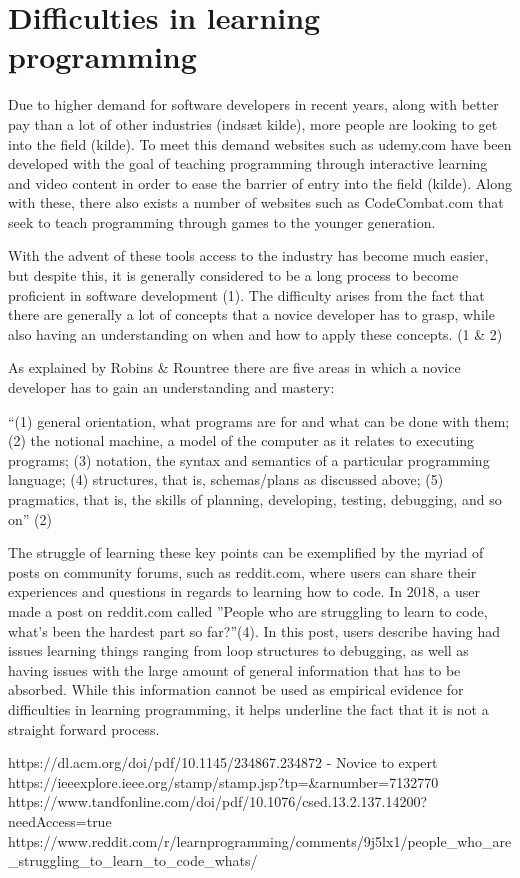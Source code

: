 \chapter{Difficulties in learning programming}


Due to higher demand for software developers in recent years, along with better pay than a lot of other industries (indsæt kilde), more people are looking to get into the field (kilde). 
To meet this demand websites such as udemy.com have been developed with the goal of teaching programming through interactive learning and video content in order to ease the barrier of entry into the field (kilde).  
Along with these, there also exists a number of websites such as CodeCombat.com that seek to teach programming through games to the younger generation. 

With the advent of these tools access to the industry has become much easier, but despite this, it is generally considered to be a long process to become proficient in software development (1). 
The difficulty arises from the fact that there are generally a lot of concepts that a novice developer has to grasp, while also having an understanding on when and how to apply these concepts. (1 & 2)

As explained by Robins & Rountree there are five areas in which a novice developer has to gain an understanding and mastery:

“(1) general orientation, what programs are for and what can be done with them; 
(2) the notional machine, a model of the computer as it relates to executing programs; 
(3) notation, the syntax and semantics of a particular programming language; 
(4) structures, that is, schemas/plans as discussed above; 
(5) pragmatics, that is, the skills of planning, developing, testing, debugging, and so on”
(2)

The struggle of learning these key points can be exemplified by the myriad of posts on community forums, such as reddit.com, where users can share their experiences and questions in regards to learning how to code.
In 2018, a user made a post on reddit.com called ”People who are struggling to learn to code, what's been the hardest part so far?”(4). 
In this post, users describe having had issues learning things ranging from loop structures to debugging, as well as having issues with the large amount of general information that has to be absorbed. 
While this information cannot be used as empirical evidence for difficulties in learning programming, it helps underline the fact that it is not a straight forward process. 




https://dl.acm.org/doi/pdf/10.1145/234867.234872 - Novice to expert
https://ieeexplore.ieee.org/stamp/stamp.jsp?tp=&arnumber=7132770
https://www.tandfonline.com/doi/pdf/10.1076/csed.13.2.137.14200?needAccess=true
https://www.reddit.com/r/learnprogramming/comments/9j5lx1/people_who_are_struggling_to_learn_to_code_whats/
